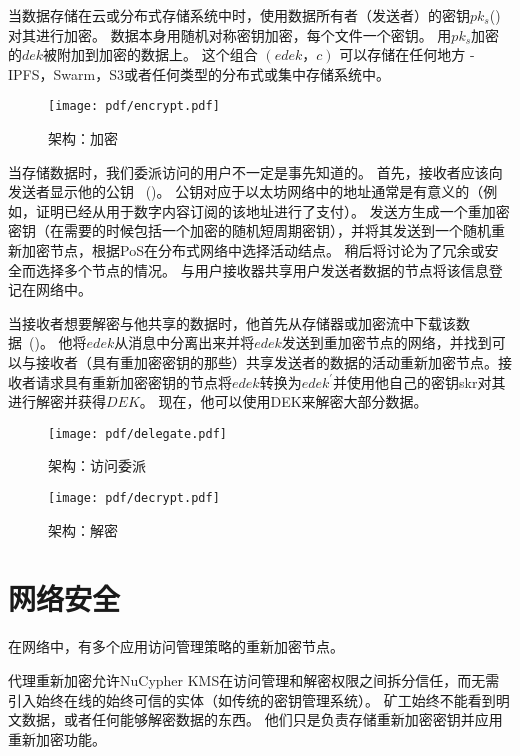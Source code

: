 \documentclass[longbibliography,nofootinbib]{revtex4-1}
\begin{document}
\begin{CJK*}{UTF8}{gbsn}
当数据存储在云或分布式存储系统中时，使用数据所有者（发送者）的密钥$pk_s$() 对其进行加密。 数据本身用随机对称密钥加密，每个文件一个密钥。 用$pk_s$加密的$dek$被附加到加密的数据上。 这个组合 $(edek，c)$ 可以存储在任何地方 - IPFS，Swarm，S3或者任何类型的分布式或集中存储系统中。

\begin{figure}
\centering
    \texttt{[image: pdf/encrypt.pdf]}
    \caption{架构：加密}
    \label{fig:arch-encrypt}
\end{figure}

当存储数据时，我们委派访问的用户不一定是事先知道的。 首先，接收者应该向发送者显示他的公钥 ~()。 公钥对应于以太坊网络中的地址通常是有意义的（例如，证明已经从用于数字内容订阅的该地址进行了支付）。 发送方生成一个重加密密钥（在需要的时候包括一个加密的随机短周期密钥），并将其发送到一个随机重新加密节点，根据PoS在分布式网络中选择活动结点。 稍后将讨论为了冗余或安全而选择多个节点的情况。 与用户接收器共享用户发送者数据的节点将该信息登记在网络中。

当接收者想要解密与他共享的数据时，他首先从存储器或加密流中下载该数据~()。 他将$edek$从消息中分离出来并将$edek$发送到重加密节点的网络，并找到可以与接收者（具有重加密密钥的那些）共享发送者的数据的活动重新加密节点。接收者请求具有重新加密密钥的节点将$edek$转换为$edek^{\prime}$并使用他自己的密钥skr对其进行解密并获得$DEK$。 现在，他可以使用DEK来解密大部分数据。

\begin{figure}
\centering
    \texttt{[image: pdf/delegate.pdf]}
    \caption{架构：访问委派}
    \label{fig:arch-delegate}
\end{figure}

\begin{figure}
\centering
    \texttt{[image: pdf/decrypt.pdf]}
    \caption{架构：解密}
    \label{fig:arch-decrypt}
\end{figure}

\section{网络安全}

在网络中，有多个应用访问管理策略的重新加密节点。

    代理重新加密允许NuCypher KMS在访问管理和解密权限之间拆分信任，而无需引入始终在线的始终可信的实体（如传统的密钥管理系统）。 矿工始终不能看到明文数据，或者任何能够解密数据的东西。 他们只是负责存储重新加密密钥并应用重新加密功能。
    

\end{CJK*}
\end{document}
